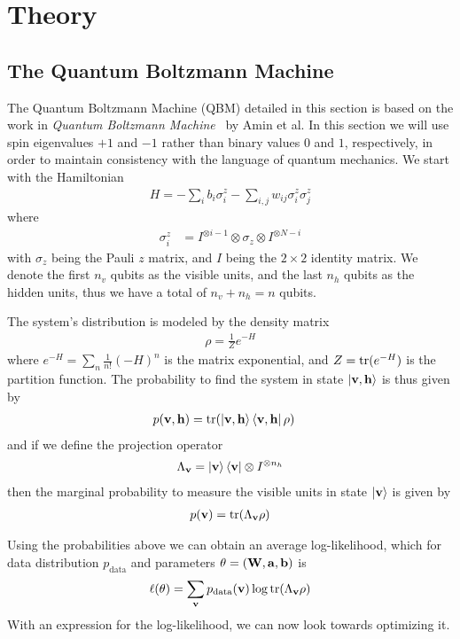 \section{Theory}
\subsection{The Quantum Boltzmann Machine}
The Quantum Boltzmann Machine (QBM) detailed in this section is based on the work in \textit{Quantum Boltzmann Machine}~\cite{amin_2018} by Amin et al.
In this section we will use spin eigenvalues \( +1 \) and \( -1 \) rather than binary values \( 0 \) and \( 1 \), respectively, in order to maintain consistency with the language of quantum mechanics.
We start with the Hamiltonian
\begin{align}
    H = -\sum_i b_i \sigma_i^z - \sum_{i,j} w_{ij} \sigma_i^z \sigma_j^z
\end{align}
where
\begin{align}
    \sigma_i^z
        &= I^{\otimes i-1} \otimes \sigma_z \otimes I^{\otimes N-i}
\end{align}
with \( \sigma_z \) being the Pauli \( z \) matrix, and \( I \) being the \( 2 \times 2 \) identity matrix.
We denote the first \( n_v \) qubits as the visible units, and the last \( n_h \) qubits as the hidden units, thus we have a total of \( n_v + n_h = n \) qubits.

The system's distribution is modeled by the density matrix
\begin{align}
    \rho = \frac{1}{Z} e^{-H}
\end{align}
where \( e^{-H} = \sum_n \frac{1}{n!} (-H)^n \) is the matrix exponential, and \( Z = \text{tr}(e^{-H}) \) is the partition function.
The probability to find the system in state \( \ket{\mathbf{v},\mathbf{h}} \) is thus given by
\begin{align}
    p(\mathbf{v},\mathbf{h})
        &= \text{tr}(\ket{\mathbf{v},\mathbf{h}}\bra{\mathbf{v},\mathbf{h}} \rho)
\end{align}
and if we define the projection operator
\begin{align}
    \Lambda_{\mathbf{v}} = \ket{\mathbf{v}}\bra{\mathbf{v}} \otimes I^{\otimes n_h}
\end{align}
then the marginal probability to measure the visible units in state \( \ket{\mathbf{v}} \) is given by
\begin{align}
    p(\mathbf{v}) = \text{tr}(\Lambda_{\mathbf{v}}\rho)
\end{align}

Using the probabilities above we can obtain an average log-likelihood, which for data distribution \( p_\text{data} \) and parameters \( \theta = (\mathbf{W}, \mathbf{a}, \mathbf{b}) \) is
\begin{align}
    \ell(\theta) = \sum_{\mathbf{v}} p_{\text{data}}(\mathbf{v}) \log \text{tr}(\Lambda_{\mathbf{v}}\rho)
\end{align}
With an expression for the log-likelihood, we can now look towards optimizing it.

